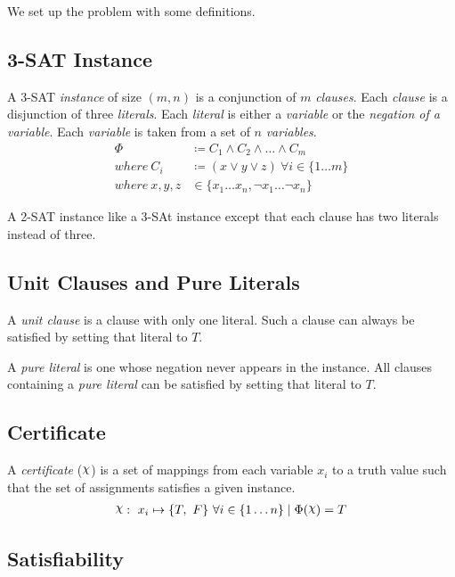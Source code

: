 We set up the problem with some definitions.


\subsection{3-SAT Instance}
\label{subsec:3-sat-instance}

A 3-SAT \textit{instance} of size $(m, n)$ is a conjunction of $m$ \textit{clauses}.
Each \textit{clause} is a disjunction of three \textit{literals}.
Each \textit{literal} is either a \textit{variable} or the \textit{negation of a variable}.
Each \textit{variable} is taken from a set of $n$ \textit{variables}.
\begin{align*}
    \Phi & \coloneqq C_1 \land C_2 \land \ldots \land C_m \\
    where~ C_i & \coloneqq (x \lor y \lor z)~ \forall i \in \{ 1 \ldots m \} \\
    where~ x, y, z & \in \{ x_1 \ldots x_n, \lnot x_1 \ldots \lnot x_n \}
\end{align*}

A 2-SAT instance like a 3-SAt instance except that each clause has two literals instead of three.


\subsection{Unit Clauses and Pure Literals}
\label{subsec:unit-clauses-and-pure-literals}

A \textit{unit clause} is a clause with only one literal.
Such a clause can always be satisfied by setting that literal to $T$.

A \textit{pure literal} is one whose negation never appears in the instance.
All clauses containing a \textit{pure literal} can be satisfied by setting that literal to $T$.


\subsection{Certificate}
\label{subsec:certificate}

A \textit{certificate} ($\rchi$) is a set of mappings from each variable $x_i$ to a truth value such that the set of assignments satisfies a given instance.
\begin{align*}
    \rchi :~ x_i \mapsto \{ T,~ F \}~ \forall i \in \{ 1 \ldots n \}
    \mid \Phi(\rchi) = T
\end{align*}


\subsection{Satisfiability}
\label{subsec:satisfiability}

